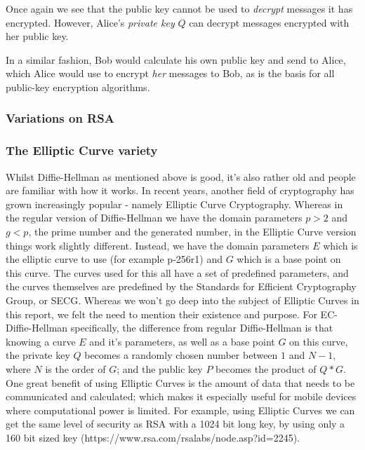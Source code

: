 Once again we see that the public key cannot be used to \textit{decrypt} messages it has encrypted. However, Alice's \textit{private key} $Q$ can decrypt messages encrypted with her public key.

In a similar fashion, Bob would calculate his own public key and send to Alice, which Alice would use to encrypt \textit{her} messages to Bob, as is the basis for all public-key encryption algorithms.

\subsubsection[Variations on RSA]{Variations on RSA}

\subsubsection[The Elliptic Curve variety]{The Elliptic Curve variety}

Whilst Diffie-Hellman as mentioned above is good, it's also rather old and people are familiar with how it works. In recent years, another field of cryptography has grown increasingly popular - namely Elliptic Curve Cryptography. Whereas in the regular version of Diffie-Hellman we have the domain parameters $p > 2$ and $g < p$, the prime number and the generated number, in the Elliptic Curve version things work slightly different.
Instead, we have the domain parameters $E$ which is the elliptic curve to use (for example p-256r1) and $G$ which is a base point on this curve.
The curves used for this all have a set of predefined parameters, and the curves themselves are predefined by the Standards for Efficient Cryptography Group, or SECG.
Whereas we won't go deep into the subject of Elliptic Curves in this report, we felt the need to mention their existence and purpose. For EC-Diffie-Hellman specifically, the difference from regular Diffie-Hellman is that knowing a curve $E$ and it's parameters, as well as a base point $G$ on this curve, the private key $Q$ becomes a randomly chosen number between $1$ and $N-1$, where $N$ is the order of $G$; and the public key $P$ becomes the product of $Q*G$. 
One great benefit of using Elliptic Curves is the amount of data that needs to be communicated and calculated; which makes it especially useful for mobile devices where computational power is limited.
For example, using Elliptic Curves we can get the same level of security as RSA with a 1024 bit long key, by using only a 160 bit sized key (https://www.rsa.com/rsalabs/node.asp?id=2245). 


